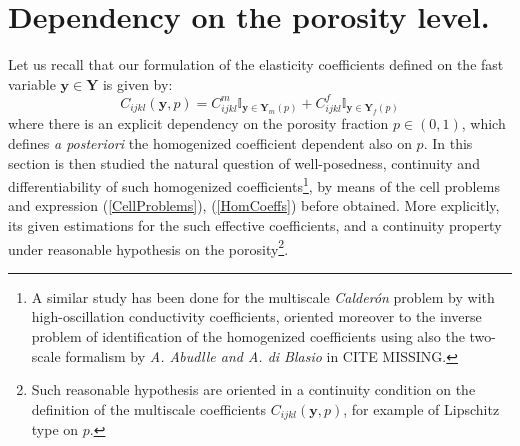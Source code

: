 \section{Dependency on the porosity level.}
Let us recall that our formulation of the elasticity coefficients defined on the fast variable $\mathbf{y} \in \mathbf{Y}$ is given by:
\begin{equation*}
    C_{ijkl}(\mathbf{y}, p) = C_{ijkl}^{m} \mathbb{I}_{\mathbf{y} \in \mathbf{Y}_m(p)} + C_{ijkl}^{f} \mathbb{I}_{\mathbf{y} \in \mathbf{Y}_f(p)}
\end{equation*}
where there is an explicit dependency on the porosity fraction $p \in (0,1)$, which defines \textit{a posteriori} the homogenized coefficient dependent also on $p$. In this section is then studied the natural question of well-posedness, continuity and differentiability of such homogenized coefficients\footnote{A similar study has been done for the multiscale \textit{Calderón} problem by with high-oscillation conductivity coefficients, oriented moreover to the inverse problem of identification of the homogenized coefficients using also the two-scale formalism by \textit{A. Abudlle and A. di Blasio} in CITE MISSING.}, by means of the cell problems and expression (\ref{CellProblems}), (\ref{HomCoeffs}) before obtained.
More explicitly, its given estimations for the such effective coefficients, and a continuity property under reasonable hypothesis on the porosity\footnote{Such reasonable hypothesis are oriented in a continuity condition on the definition of the multiscale coefficients $C_{ijkl}(\mathbf{y},p)$, for example of Lipschitz type on $p$.}.

